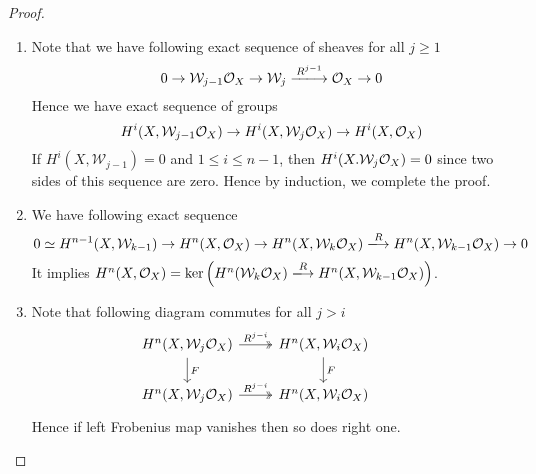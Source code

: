 \documentclass[11pt,a4paper]{scmsnotes}
\begin{document}
\begin{proof}
	\begin{enumerate}
		\item Note that we have following exact sequence of sheaves for all $j \geq 1$
		\[
		0 \to \mathcal{W}_{j-1} \sheaf{X} \to \mathcal{W}_{j} \xlongrightarrow {R^{j-1}} \sheaf{X} \to 0
		\]
		Hence we have exact sequence of groups
		\[
		H^{i}(X, \mathcal{W}_{j-1} \mathcal{O}_{X}) \to H^{i}(X, \mathcal{W}_{j} \mathcal{O}_{X}) \to H^{i}(X,\mathcal{O}_{X})
		\]
		If $H^i(X,\mathcal{W}_{j-1})=0$ and $1 \leq i \leq n-1$, then $H^i(X. \mathcal{W}_j \mathcal{O}_{X}) =0 $ since two sides of this sequence are zero. Hence by induction, we complete the proof.
		\item We have following exact sequence 
		\[
		0 \simeq H^{n-1}(X, \mathcal{W}_{k-1}) \to H^n(X,\sheaf{X}) \to H^n(X,\mathcal{W}_k \sheaf{X}) \xlongrightarrow{R} H^n(X, \mathcal{W}_{k-1}\sheaf{X}) \to 0
		\]
		It implies $H^n(X,\sheaf{X}) = \ker \left(H^n(\mathcal{W}_k \sheaf{X}) \xlongrightarrow{R} H^n(X,\mathcal{W}_{k-1} \sheaf{X})\right)$.
		\item Note that following diagram commutes for all $j>i$
		\[
		\begin{tikzcd}
		H^n(X,\mathcal{W}_{j} \sheaf{X}) \arrow[r,"R^{j-i}",two heads] \arrow[d, "F"]& H^n(X,\mathcal{W}_i \sheaf{X}) \arrow[d, "F"]&\\
		H^n(X,\mathcal{W}_j \sheaf{X}) \arrow[r, "R^{j-i}",two heads] &H^n(X, \mathcal{W}_i \sheaf{X})&
		\end{tikzcd}
		\]
		Hence if left Frobenius map vanishes then so does right one.
	\end{enumerate}
\end{proof}
\end{document}
